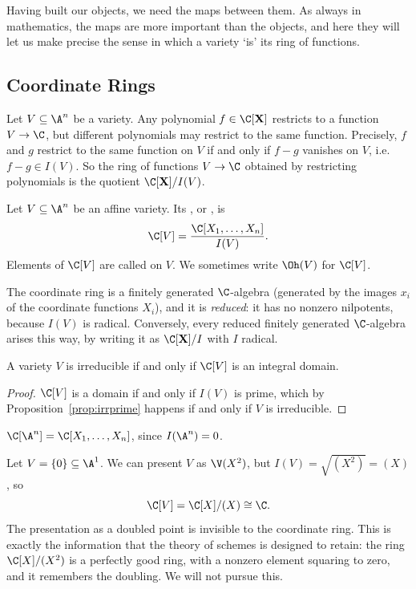 Having built our objects, we need the maps between them. As always in mathematics, the maps are more important than the objects, and here they will let us make precise the sense in which a variety `is' its ring of functions.

\subsection{Coordinate Rings}

Let $V \subseteq \A^n$ be a variety. Any polynomial $f \in \C[\mathbf{X}]$ restricts to a function $V \to \C$, but different polynomials may restrict to the same function. Precisely, $f$ and $g$ restrict to the same function on $V$ if and only if $f - g$ vanishes on $V$, i.e.\ $f - g \in I(V)$. So the ring of functions $V \to \C$ obtained by restricting polynomials is the quotient $\C[\mathbf{X}]/I(V)$.

\begin{definition}
	Let $V \subseteq \A^n$ be an affine variety. Its , or , is
	$$\C[V] = \frac{\C[X_1,\dots,X_n]}{I(V)}.$$
	Elements of $\C[V]$ are called  on $V$. We sometimes write $\Oh(V)$ for $\C[V]$.
\end{definition}

The coordinate ring is a finitely generated $\C$-algebra (generated by the images $x_i$ of the coordinate functions $X_i$), and it is \emph{reduced}: it has no nonzero nilpotents, because $I(V)$ is radical. Conversely, every reduced finitely generated $\C$-algebra arises this way, by writing it as $\C[\mathbf{X}]/I$ with $I$ radical.

\begin{corollary}
	A variety $V$ is irreducible if and only if $\C[V]$ is an integral domain.
\end{corollary}

\begin{proof}
	$\C[V]$ is a domain if and only if $I(V)$ is prime, which by Proposition~\ref{prop:irrprime} happens if and only if $V$ is irreducible.
\end{proof}

\begin{example}
	$\C[\A^n] = \C[X_1,\dots,X_n]$, since $I(\A^n) = 0$.
\end{example}

\begin{example}
	Let $V = \{0\} \subseteq \A^1$. We can present $V$ as $\V(X^2)$, but $I(V) = \sqrt{(X^2)} = (X)$, so
	$$\C[V] = \C[X]/(X) \cong \C.$$
	The presentation as a doubled point is invisible to the coordinate ring. This is exactly the information that the theory of schemes is designed to retain: the ring $\C[X]/(X^2)$ is a perfectly good ring, with a nonzero element squaring to zero, and it remembers the doubling. We will not pursue this.
\end{example}

